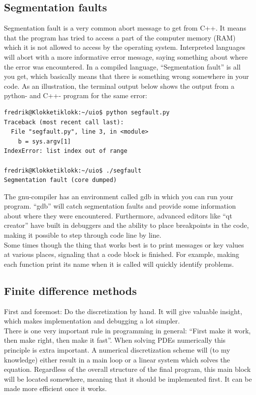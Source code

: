 \subsection{Segmentation faults}
Segmentation fault is a very common abort message to get from C++. It means that the program has tried to access a part of the computer memory (RAM) which it is not allowed to access by the operating system. 
Interpreted languages will abort with a more informative error message, saying something about where the error was encountered. 
In a compiled language, ``Segmentation fault'' is all you get, which basically means that there is something wrong somewhere in your code. 
As an illustration, the terminal output below shows the output from a python- and C++- program for the same error:
\begin{lstlisting}
fredrik@Klokketiklokk:~/uio$ python segfault.py 
Traceback (most recent call last):
  File "segfault.py", line 3, in <module>
    b = sys.argv[1]
IndexError: list index out of range

fredrik@Klokketiklokk:~/uio$ ./segfault 
Segmentation fault (core dumped)
\end{lstlisting}

The gnu-compiler has an environment called gdb in which you can run your program. 
``gdb'' will catch segmentation faults and provide some information about where they were encountered. 
Furthermore, advanced editors like ``qt creator'' have built in debuggers and the ability to place breakpoints in the code, making it possible to step through code line by line. \\
Some times though the thing that works best is to print messages or key values at various places, signaling that a code block is finished. 
For example, making each function print its name when it is called will quickly identify problems. 

\subsection{Finite difference methods}
First and foremost: Do the discretization by hand. 
It will give valuable insight, which makes implementation and debugging a lot simpler. \\

There is one very important rule in programming in general: ``First make it work, then make right, then make it fast''. 
When solving PDEs numerically this principle is extra important. 
A numerical discretization scheme will (to my knowledge) either result in a main loop or a linear system which solves the equation. 
Regardless of the overall structure of the final program, this main block will be located somewhere, meaning that it should be implemented first. 
It can be made more efficient once it works. \\

